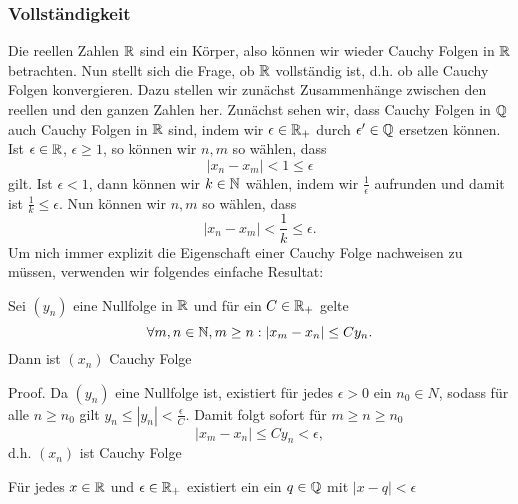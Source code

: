 \subsubsection{Vollständigkeit}
\label{\detokenize{grundlagen/zahlensysteme:vollstandigkeit}}
Die reellen Zahlen \(\mathbb{R}\) sind ein Körper, also können wir wieder Cauchy Folgen in \(\mathbb{R}\) betrachten. Nun stellt sich die Frage, ob \(\mathbb{R}\) vollständig ist, d.h. ob alle Cauchy Folgen konvergieren. Dazu stellen wir zunächst Zusammenhänge zwischen den reellen und den ganzen Zahlen her. Zunächst sehen wir, dass Cauchy Folgen in \(\mathbb{Q}\) auch Cauchy Folgen in \(\mathbb{R}\) sind, indem wir \(\epsilon \in \mathbb{R}_+\) durch \(\epsilon' \in \mathbb{Q}\) ersetzen können. Ist \(\epsilon \in \mathbb{R}\), \(\epsilon \geq 1\), so können wir \(n,m\) so wählen, dass
\begin{equation*}
|x_n -x_m| < 1 \leq \epsilon
\end{equation*}
gilt. Ist \(\epsilon < 1\), dann können wir \(k \in \mathbb{N}\) wählen, indem wir \(\frac{1}\epsilon\) aufrunden und damit ist
\(\frac{1}k \leq \epsilon\). Nun können wir \(n,m\) so wählen, dass
\begin{equation*}
|x_n -x_m| < \frac{1}k \leq \epsilon.
\end{equation*}
Um nich immer explizit die Eigenschaft einer Cauchy Folge nachweisen zu müssen, verwenden wir folgendes einfache Resultat:
\label{grundlagen/zahlensysteme:lemma-22}
\begin{lemma}{}{}



Sei \((y_n)\) eine Nullfolge in \(\mathbb{R}\) und für ein \(C \in \mathbb{R}_+\) gelte
\begin{equation*}
\forall m,n \in \mathbb{N}, m \geq n: |x_m-x_n| \leq C y_n.
\end{equation*}
Dann ist \((x_n)\) Cauchy Folge
\end{lemma}

\begin{emphBox}{}{}
Proof.  Da \((y_n)\) eine Nullfolge ist, existiert für jedes \(\epsilon > 0\) ein \(n_0 \in N\), sodass für alle \(n \geq n_0\) gilt \(y_n \leq |y_n| < \frac{\epsilon}C\). Damit folgt sofort für \(m \geq n \geq n_0\)
\begin{equation*}
|x_m-x_n| \leq C y_n < \epsilon,
\end{equation*}
d.h. \((x_n)\) ist Cauchy Folge
\end{emphBox}
\label{grundlagen/zahlensysteme:lemma-23}
\begin{lemma}{}{}



Für jedes \(x \in \mathbb{R}\) und \(\epsilon \in \mathbb{R}_+\) existiert ein ein \(q \in \mathbb{Q}\) mit \(|x-q|<\epsilon\)
\end{lemma}

